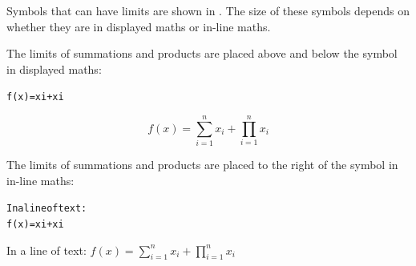 Symbols that can have limits are shown in .
The size of these symbols depends on whether they are in displayed 
maths or in-line maths. 


The limits of summations and products are placed above and below the
symbol in displayed maths:
\begin{code}
\begin{alltt}
  f(x) =  xi +  xi
\end{alltt}
\end{code}
\begin{resultS}[Image: f(x) = sum from i equals 1 to n x subscript i
+ product from i equals 1 to n x subscript i.]
\[
f(x) = \sum_{i=1}^{n} x_i + \prod_{i=1}^{n} x_i
\]
\end{resultS}


The limits of summations and products are placed to the right of the
symbol in in-line maths:
\begin{code}
\begin{alltt}
In a line of text:
  f(x) =  xi +  xi
\end{alltt}
\end{code}
\begin{resultS}
In a line of text:
\begin{math}
f(x) = \sum_{i=1}^{n} x_i + \prod_{i=1}^{n} x_i
\end{math}
\end{resultS}


